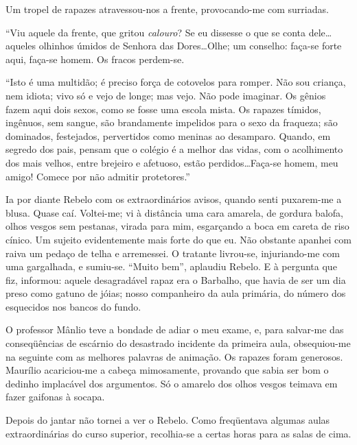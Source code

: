 
Um tropel de rapazes atravessou{}-nos a
frente, provocando{}-me com surriadas. 

``Viu aquele da frente, que
gritou \textit{calouro}? Se eu dissesse o que se conta dele\ldots aqueles olhinhos
úmidos de Senhora das Dores\ldots Olhe; um conselho: faça{}-se forte aqui,
faça{}-se homem. Os fracos perdem{}-se. 

``Isto é uma multidão; é preciso
força de cotovelos para romper. Não sou criança, nem idiota; vivo só e
vejo de longe; mas vejo. Não pode imaginar. Os gênios fazem aqui dois
sexos, como se fosse uma escola mista. Os rapazes tímidos, ingênuos,
sem sangue, são brandamente impelidos para o sexo da fraqueza; são
dominados, festejados, pervertidos como meninas ao desamparo. Quando,
em segredo dos pais, pensam que o colégio é a melhor das vidas, com o
acolhimento dos mais velhos, entre brejeiro e afetuoso, estão
perdidos\ldots Faça{}-se homem, meu amigo! Comece por não admitir
protetores.'' 

Ia por diante Rebelo com os extraordinários avisos, quando
senti puxarem{}-me a blusa. Quase caí. Voltei{}-me; vi à distância uma
cara amarela, de gordura balofa, olhos vesgos sem pestanas, virada para
mim, esgarçando a boca em careta de riso cínico. Um sujeito
evidentemente mais forte do que eu. Não obstante apanhei com raiva um
pedaço de telha e arremessei. O tratante livrou{}-se, injuriando{}-me
com uma gargalhada, e sumiu{}-se. ``Muito bem'', aplaudiu Rebelo. E à
pergunta que fiz, informou: aquele desagradável rapaz era o Barbalho,
que havia de ser um dia preso como gatuno de jóias; nosso companheiro
da aula primária, do número dos esquecidos nos bancos do fundo. 


O professor Mânlio teve a bondade de adiar o meu exame, e, para
salvar{}-me das conseqüências de escárnio do desastrado incidente da
primeira aula, obsequiou{}-me na seguinte com as melhores palavras de
animação. Os rapazes foram generosos. Maurílio acariciou{}-me a cabeça
mimosamente, provando que sabia ser bom o dedinho implacável dos
argumentos. Só o amarelo dos olhos vesgos teimava em fazer gaifonas à
socapa. 

Depois do jantar não tornei a ver o Rebelo. Como freqüentava
algumas aulas extraordinárias do curso superior, recolhia{}-se a certas
horas para as salas de cima. 

